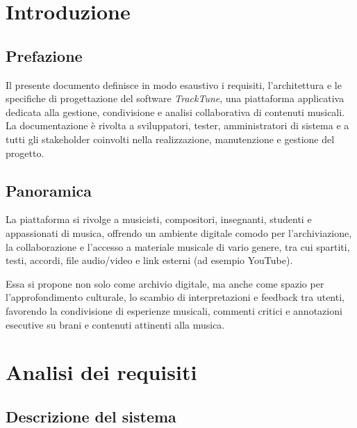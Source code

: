\documentclass[a4paper]{article}
\begin{document}


\tableofcontents
\pagebreak

\section{Introduzione}

\subsection{Prefazione}

Il presente documento definisce in modo esaustivo i requisiti, l'architettura e le specifiche di progettazione del software \textit{TrackTune},
una piattaforma applicativa dedicata alla gestione, condivisione e analisi 
collaborativa di contenuti musicali.\\[2ex] 

La documentazione è rivolta a sviluppatori, tester, amministratori di sistema e a 
tutti gli stakeholder coinvolti nella realizzazione, manutenzione e gestione del 
progetto.

\subsection{Panoramica}

La piattaforma si rivolge a musicisti, compositori, insegnanti, studenti e appassionati
di musica, offrendo un ambiente digitale comodo per l’archiviazione, la collaborazione 
e l’accesso a materiale musicale di vario genere, tra cui spartiti, testi, accordi, 
file audio/video e link esterni (ad esempio YouTube).

Essa si propone non solo come archivio digitale, 
ma anche come spazio per l’approfondimento culturale, 
lo scambio di interpretazioni e feedback tra utenti, favorendo la condivisione 
di esperienze musicali, commenti critici e annotazioni esecutive su brani e 
contenuti attinenti alla musica.

\section{Analisi dei requisiti}

\subsection{Descrizione del sistema}
\end{document}
